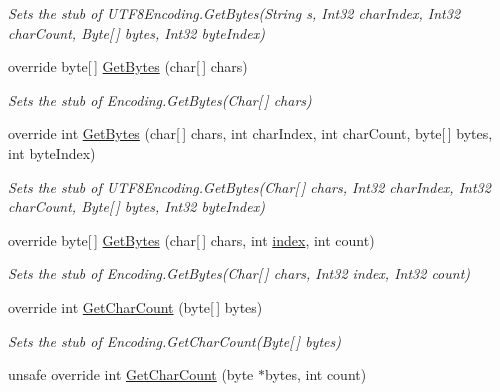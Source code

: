 \begin{DoxyCompactItemize}
\begin{DoxyCompactList}\small\item\em Sets the stub of U\-T\-F8\-Encoding.\-Get\-Bytes(\-String s, Int32 char\-Index, Int32 char\-Count, Byte\mbox{[}$\,$\mbox{]} bytes, Int32 byte\-Index)\end{DoxyCompactList}\item 
override byte\mbox{[}$\,$\mbox{]} \hyperlink{class_system_1_1_text_1_1_fakes_1_1_stub_u_t_f8_encoding_a346d883ed26242d4be97ff7cea69edb6}{Get\-Bytes} (char\mbox{[}$\,$\mbox{]} chars)
\begin{DoxyCompactList}\small\item\em Sets the stub of Encoding.\-Get\-Bytes(\-Char\mbox{[}$\,$\mbox{]} chars)\end{DoxyCompactList}\item 
override int \hyperlink{class_system_1_1_text_1_1_fakes_1_1_stub_u_t_f8_encoding_a5d61eac853748210699bd7fd187363a7}{Get\-Bytes} (char\mbox{[}$\,$\mbox{]} chars, int char\-Index, int char\-Count, byte\mbox{[}$\,$\mbox{]} bytes, int byte\-Index)
\begin{DoxyCompactList}\small\item\em Sets the stub of U\-T\-F8\-Encoding.\-Get\-Bytes(\-Char\mbox{[}$\,$\mbox{]} chars, Int32 char\-Index, Int32 char\-Count, Byte\mbox{[}$\,$\mbox{]} bytes, Int32 byte\-Index)\end{DoxyCompactList}\item 
override byte\mbox{[}$\,$\mbox{]} \hyperlink{class_system_1_1_text_1_1_fakes_1_1_stub_u_t_f8_encoding_a647c43ca5c35a94b020886f80555844b}{Get\-Bytes} (char\mbox{[}$\,$\mbox{]} chars, int \hyperlink{jquery-1_810_82-vsdoc_8js_a75bb12d1f23302a9eea93a6d89d0193e}{index}, int count)
\begin{DoxyCompactList}\small\item\em Sets the stub of Encoding.\-Get\-Bytes(\-Char\mbox{[}$\,$\mbox{]} chars, Int32 index, Int32 count)\end{DoxyCompactList}\item 
override int \hyperlink{class_system_1_1_text_1_1_fakes_1_1_stub_u_t_f8_encoding_a02db8afa0506762563a47784b5272fb4}{Get\-Char\-Count} (byte\mbox{[}$\,$\mbox{]} bytes)
\begin{DoxyCompactList}\small\item\em Sets the stub of Encoding.\-Get\-Char\-Count(\-Byte\mbox{[}$\,$\mbox{]} bytes)\end{DoxyCompactList}\item 
unsafe override int \hyperlink{class_system_1_1_text_1_1_fakes_1_1_stub_u_t_f8_encoding_a5bdd51d6701e49a8bd3ef6c41eff4692}{Get\-Char\-Count} (byte $\ast$bytes, int count)

\end{DoxyCompactItemize}
